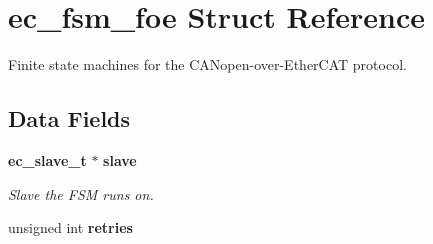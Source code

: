 \section{ec\-\_\-fsm\-\_\-foe Struct Reference}
\label{structec__fsm__foe}


Finite state machines for the C\-A\-Nopen-\/over-\/\-Ether\-C\-A\-T protocol.  


\subsection*{Data Fields}
\begin{DoxyCompactItemize}
\item 
{\bf ec\-\_\-slave\-\_\-t} $\ast$ {\bf slave}
\begin{DoxyCompactList}\small\item\em Slave the F\-S\-M runs on. \end{DoxyCompactList}\item 
unsigned int {\bf retries}\label{structec__fsm__foe_a265053a6c277b9bf66c2a28489385d13}


\end{DoxyCompactItemize}

